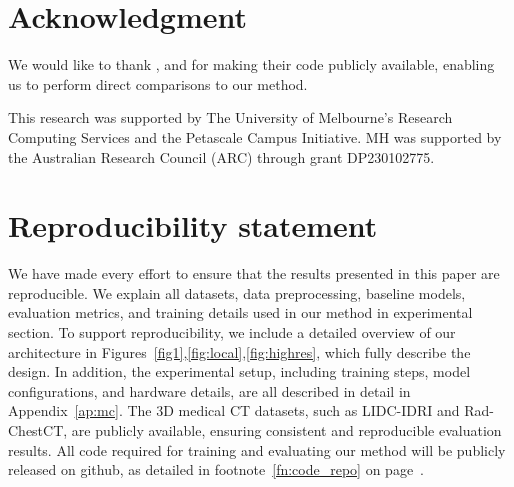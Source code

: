 \section{Acknowledgment}
We would like to thank \citet{sun2022hierarchical}, \citet{khader2023medical} and \citet{friedrich2024wdm} for making their code publicly available, enabling us to perform direct comparisons to our method.

This research was supported by The University of Melbourne’s Research Computing Services and the Petascale Campus Initiative. MH was supported by the Australian Research Council (ARC) through grant DP230102775.

\section{Reproducibility statement}
We have made every effort to ensure that the results presented in this paper are reproducible. We explain all datasets, data preprocessing, baseline models, evaluation metrics, and training details used in our method in experimental section. To support reproducibility, we include a detailed overview of our architecture in Figures~\ref{fig1},\ref{fig:local},\ref{fig:highres}, which fully describe the design. In addition, the experimental setup, including training steps, model configurations, and hardware details, are all described in detail in Appendix~\ref{ap:mc}. The 3D medical CT datasets, such as LIDC-IDRI and Rad-ChestCT, are publicly available, ensuring consistent and reproducible evaluation results. All code required for training and evaluating our method will be publicly released on github, as detailed in footnote~\ref{fn:code_repo} on page~\pageref{fn:code_repo}.